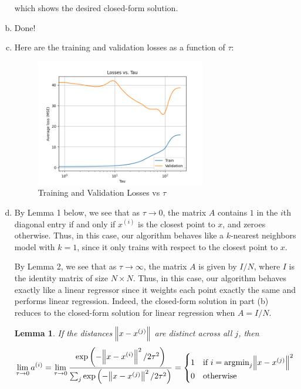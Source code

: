 \documentclass{article}
\newtheorem{lemma}[theorem]{Lemma}
\begin{document}
\begin{enumerate}[(a)]
    which shows the desired closed-form solution. 

    \item Done!
    
    \item Here are the training and validation losses as a function of $\tau$:
    
    \begin{figure}[H]
        \centering
        \includegraphics[width=0.7\textwidth]{../figures/q4.png}
        \caption{Training and Validation Losses vs $\tau$}
        \label{fig:q4c_tau_vs_loss}
    \end{figure}

    \item By Lemma 1 below, we see that as $\tau \to 0$, the matrix $A$ contains $1$ in the $i$th diagonal entry if and only if $x^{(i)}$ is the closest point to $x$, and zeroes otherwise. Thus, in this case, our algorithm behaves like a $k$-nearest neighbors model with $k = 1$, since it only trains with respect to the closest point to $x$.
    
    By Lemma 2, we see that as $\tau \to \infty$, the matrix $A$ is given by $I/N$, where $I$ is the identity matrix of size $N \times N$. Thus, in this case, our algorithm behaves exactly like a linear regressor since it weights each point exactly the same and performs linear regression. Indeed, the closed-form solution in part (b) reduces to the closed-form solution for linear regression when $A = I/N$.
    
    \begin{lemma}
        If the distances $\norm{x - x^{(j)}}$ are distinct across all $j$, then \[ \lim_{\tau \to 0} a^{(i)} = \lim_{\tau \to 0}  \frac{\exp\left(-\norm{x - x^{(i)}}^2 /2\tau^2 \right)}{\sum_{j} \exp\left(-\norm{x - x^{(j)}}^2 /2\tau^2\right)} = \begin{cases}
            1 & \text{if $i = \textup{argmin}_j \norm{x - x^{(j)}}^2$} \\
            0 & \text{otherwise}
        \end{cases} \]
    \end{lemma}


\end{enumerate}
\end{document}
